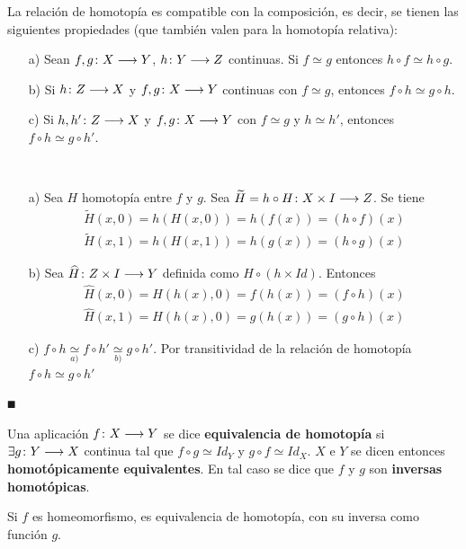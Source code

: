\documentclass[GTS.tex]{subfiles}
\begin{document}
\begin{lemma}\label{lema} La relación de homotopía es compatible con la composición, es decir, se tienen las siguientes propiedades (que también valen para la homotopía relativa):
\begin{enumerate}
\item[a)] Sean $f,g\colon{X}\longrightarrow{Y}$, $h\colon{Y}\longrightarrow{Z}$ continuas. Si $f\simeq g$ entonces $h\circ f\simeq h\circ g$.
\item[b)] Si $h\colon{Z}\longrightarrow{X}$ y $f,g\colon{X}\longrightarrow{Y}$ continuas con $f\simeq g$, entonces $f\circ h\simeq g\circ h$.
\item[c)] Si $h,h'\colon{Z}\longrightarrow{X}$ y $f,g\colon{X}\longrightarrow{Y}$ con $f\simeq g$ y $h\simeq h'$, entonces $f\circ h\simeq g\circ h'$.
\end{enumerate}
\end{lemma}
\begin{dem}\
\begin{enumerate}
\item[a)] Sea $H$ homotopía entre $f$ y $g$. Sea $\widetilde{H}=h\circ H\colon{X\times I}\longrightarrow{Z}$. Se tiene
\begin{gather*}
\widetilde{H}(x,0)=h(H(x,0))=h(f(x))=(h\circ f)(x)\\
\widetilde{H}(x,1)=h(H(x,1))=h(g(x))=(h\circ g)(x)
\end{gather*}
\item[b)] Sea $\widehat{H}\colon{Z\times I}\longrightarrow{Y}$ definida como $H\circ(h\times Id)$. Entonces
\begin{gather*}
\widehat{H}(x,0)=H(h(x),0)=f(h(x))=(f\circ h)(x)\\
\widehat{H}(x,1)=H(h(x),0)=g(h(x))=(g\circ h)(x)
\end{gather*}
\item[c)] $f\circ h\underset{a)}{\simeq}f\circ h'\underset{b)}{\simeq}g\circ h'$. Por transitividad de la relación de homotopía $f\circ h\simeq g\circ h'$
\end{enumerate}
$\QED$
\end{dem}

\begin{defi} Una aplicación $f\colon{X}\longrightarrow{Y}$ se dice \textbf{equivalencia de homotopía} si $\exists g\colon{Y}\longrightarrow{X}$ continua tal que $f\circ g\simeq Id_Y$ y $g\circ f\simeq Id_X$. $X$ e $Y$ se dicen entonces \textbf{homotópicamente equivalentes}. En tal caso se dice que $f$ y $g$ son \textbf{inversas homotópicas}.
\end{defi}

\begin{nota} Si $f$ es homeomorfismo, es equivalencia de homotopía, con su inversa como función $g$.
\end{nota}
\end{document}
